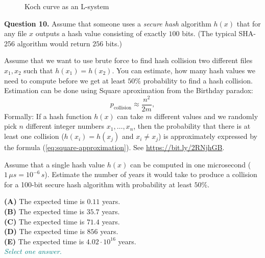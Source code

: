 \documentclass[jou]{apa6}
\begin{document}
\begin{figure}[!htb]
\caption{\label{fig:lindenmayer-system} Koch curve as an L-system}
\end{figure}





\vspace{10pt}
{\bf Question 10.} Assume that someone uses
a {\em secure hash} algorithm $h(x)$ that for any file $x$
outputs a hash value consisting of exactly $100$
bits. (The typical SHA-256 algorithm would return $256$ bits.)

Assume that we want to use brute force to find 
hash collision \textendash{} two different files $x_1,x_2$
such that $h(x_1) = h(x_2)$. 
You can estimate, how many hash values we need to compute before we 
get at least $50\%$ probability to find a hash collision. 
Estimation can be done using Square aproximation from 
the Birthday paradox: 
\begin{equation}
\label{eq:square-approximation}
p_{\text{collision}} \approx \frac{n^2}{2m},
\end{equation}
Formally: If a hash function $h(x)$ can take $m$ different values and
we randomly pick $n$ different integer numbers $x_1,\ldots,x_n$, then the probability 
that there is at least one collision ($h(x_i) = h(x_j)$ and $x_i \neq x_j$) is approximately expressed by
the formula (\ref{eq:square-approximation}). See \url{https://bit.ly/2RNjhGB}.

Assume that a single hash value $h(x)$ can be computed in one microsecond
($1\,\mu{}s = 10^{-6}\,s$). Estimate the number of years it would take to produce a
collision for a 100-bit secure hash algorithm with probability at least $50\%$. 

{\bf (A)} The expected time is $0.11$ years.\\
{\bf (B)} The expected time is $35.7$ years.\\
{\bf (C)} The expected time is $71.4$ years.\\
{\bf (D)} The expected time is $856$ years.\\
{\bf (E)} The expected time is $4.02\cdot 10^{16}$ years.\\
\textcolor{teal}{\em Select one answer.}
\end{document}
